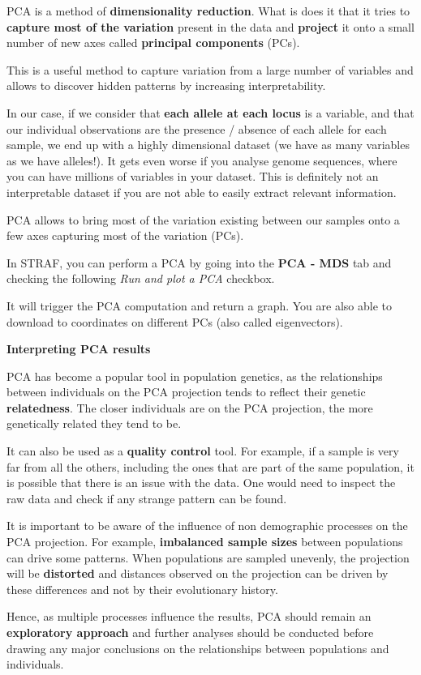 \documentclass[
]{book}
\begin{document}
PCA is a method of \textbf{dimensionality reduction}. What is does it that it tries to
\textbf{capture most of the variation} present in the data and \textbf{project} it onto a
small number of new axes called \textbf{principal components} (PCs).

This is a useful method to capture variation from a large number of variables and
allows to discover hidden patterns by increasing interpretability.

In our case, if we consider that \textbf{each allele at each locus} is a variable, and that
our individual observations are the presence / absence of each allele for each sample,
we end up with a highly dimensional dataset (we have as many variables as we have
alleles!). It gets even worse if you analyse genome sequences, where you can have millions
of variables in your dataset. This is definitely not an interpretable dataset if you
are not able to easily extract relevant information.

PCA allows to bring most of the variation existing between our samples onto a few
axes capturing most of the variation (PCs).

In STRAF, you can perform a PCA by going into the \textbf{PCA - MDS} tab and checking
the following \emph{Run and plot a PCA} checkbox.

It will trigger the PCA computation and return a graph. You are also able to
download to coordinates on different PCs (also called eigenvectors).

\begin{interpretation}
\textbf{Interpreting PCA results}

PCA has become a popular tool in population genetics, as the relationships between
individuals on the PCA projection tends to reflect their genetic \textbf{relatedness}. The
closer individuals are on the PCA projection, the more genetically related they tend to be.

It can also be used as a \textbf{quality control} tool. For example, if a sample is very far
from all the others, including the ones that are part of the same population,
it is possible that there is an issue with the data. One would need to inspect
the raw data and check if any strange pattern can be found.

It is important to be aware of the influence of non demographic processes on
the PCA projection. For example, \textbf{imbalanced sample sizes} between populations
can drive some patterns. When populations are sampled unevenly, the projection will
be \textbf{distorted} and distances observed on the projection can be driven by these
differences and not by their evolutionary history.

Hence, as multiple processes influence the results, PCA should remain an
\textbf{exploratory approach} and further analyses should be conducted before drawing
any major conclusions on the relationships between populations and individuals.

\end{interpretation}
\end{document}
